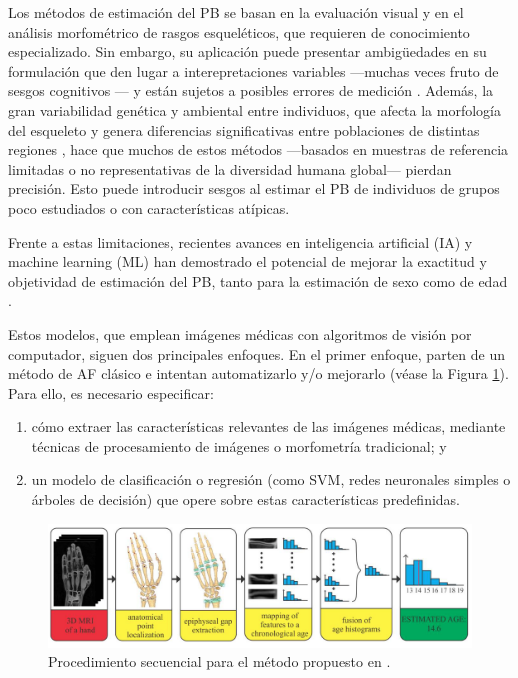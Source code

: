 Los métodos de estimación del PB se basan en la evaluación visual y en el análisis morfométrico de rasgos 
esqueléticos, que requieren de conocimiento especializado. Sin embargo, su aplicación puede presentar 
ambigüedades en su formulación que den lugar a interepretaciones variables ---muchas veces fruto de sesgos 
cognitivos \cite{nakhaeizadeh2014, cooper2019}--- y están sujetos a posibles errores de medición 
\cite{langley2018}.
Además, la gran variabilidad genética y ambiental entre individuos, que afecta la morfología del esqueleto y 
genera diferencias significativas entre poblaciones de distintas regiones \cite{ubelaker2017}, hace que muchos 
de estos métodos ---basados en muestras de referencia limitadas o no representativas de la diversidad humana 
global--- pierdan precisión. Esto puede introducir sesgos al estimar el PB de individuos de 
grupos poco estudiados o con características atípicas.

Frente a estas limitaciones, recientes avances en inteligencia artificial (IA) y machine learning (ML) han 
demostrado el potencial de mejorar la exactitud y objetividad de estimación del PB, tanto para la estimación 
de sexo \cite{curate2017, darmawan2015, pinto2016} como de edad \cite{kim2017, larson2018, lee2017}. 

Estos modelos, que emplean imágenes médicas con algoritmos de visión por computador, siguen dos principales enfoques.
En el primer enfoque, parten de un método de AF clásico e intentan automatizarlo y/o mejorarlo 
\cite{stern2014, ajafernandez2004} (véase la Figura \ref{fig:MRI_pipeline}). 
Para ello, es necesario especificar:

\begin{enumerate}

    \item cómo extraer las características relevantes de las imágenes médicas, mediante técnicas de procesamiento de 
    imágenes o morfometría tradicional; y
    
    \item un modelo de clasificación o regresión (como SVM, redes neuronales simples o árboles de decisión) 
    que opere sobre estas características predefinidas.

\end{enumerate}

\begin{figure}[h]
    \centering
    \includegraphics[width=\textwidth]{capitulos/cap_01/imagenes/MRI_pipeline.png}
    \caption{Procedimiento secuencial para el método propuesto en \cite{stern2014}.} 
    \label{fig:MRI_pipeline}
\end{figure}

